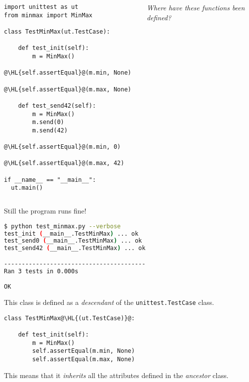 \documentclass[english,serif,mathserif,xcolor=pdftex,dvipsnames,table]{beamer}
\begin{document}
\begin{frame}[fragile]
  \begin{columns}[t]
    \begin{column}{0.5\textwidth}
\begin{lstlisting}
import unittest as ut
from minmax import MinMax

class TestMinMax(ut.TestCase):

    def test_init(self):
        m = MinMax()
        @\HL{self.assertEqual}@(m.min, None)
        @\HL{self.assertEqual}@(m.max, None)

    def test_send42(self):
        m = MinMax()
        m.send(0)
        m.send(42)
        @\HL{self.assertEqual}@(m.min, 0)
        @\HL{self.assertEqual}@(m.max, 42)

if __name__ == "__main__":
  ut.main()
\end{lstlisting}
    \end{column}
    \begin{column}{0.5\textwidth}
      \raggedleft 
      \emph{Where have these functions been defined?}
    \end{column}
  \end{columns}
\end{frame}


\begin{frame}[fragile]
  Still the program runs fine!

  \+
\begin{lstlisting}[language=sh]
$ python test_minmax.py --verbose
test_init (__main__.TestMinMax) ... ok
test_send0 (__main__.TestMinMax) ... ok
test_send42 (__main__.TestMinMax) ... ok

----------------------------------------
Ran 3 tests in 0.000s

OK
\end{lstlisting}
\end{frame}

\begin{frame}[fragile]
  This class is defined as a \emph{descendant} of
  the \texttt{unittest.TestCase} class.
  
  \+ 
\begin{lstlisting}
class TestMinMax@\HL{(ut.TestCase)}@:

    def test_init(self):
        m = MinMax()
        self.assertEqual(m.min, None)
        self.assertEqual(m.max, None)
\end{lstlisting}

  \+
  This means that it \emph{inherits} all the attributes defined
  in the \emph{ancestor} class.
\end{frame}
\end{document}
